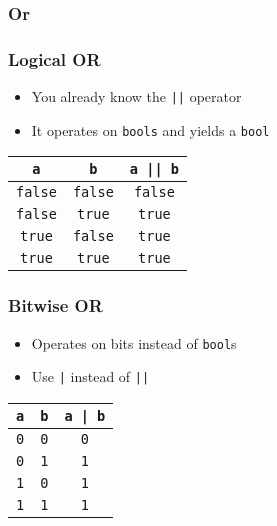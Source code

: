 \subsubsection{Or}
\frame{\tableofcontents[currentsubsection]}

\begin{frame}
  \frametitle{Logical OR}
  \begin{itemize}
    \item You already know the \texttt{||} operator
    \item It operates on \texttt{bools} and yields a \texttt{bool}
  \end{itemize}
  \begin{center}
    \begin{tabular}{ccc}
      \toprule
      \texttt{a} & \texttt{b} & \texttt{a || b} \\
      \midrule
      \texttt{false} & \texttt{false} & \texttt{false} \\
      \texttt{false} & \texttt{true} & \texttt{true} \\
      \texttt{true} & \texttt{false} & \texttt{true} \\
      \texttt{true} & \texttt{true} & \texttt{true} \\
      \bottomrule
    \end{tabular}
  \end{center}
\end{frame}

\begin{frame}
  \frametitle{Bitwise OR}
  \begin{itemize}
    \item Operates on bits instead of \texttt{bool}s
    \item Use \texttt{|} instead of \texttt{||}
  \end{itemize}
  \begin{center}
    \begin{tabular}{ccc}
      \toprule
      \texttt{a} & \texttt{b} & \texttt{a | b} \\
      \midrule
      \texttt{0} & \texttt{0} & \texttt{0} \\
      \texttt{0} & \texttt{1} & \texttt{1} \\
      \texttt{1} & \texttt{0} & \texttt{1} \\
      \texttt{1} & \texttt{1} & \texttt{1} \\
      \bottomrule
    \end{tabular}
  \end{center}
\end{frame}


